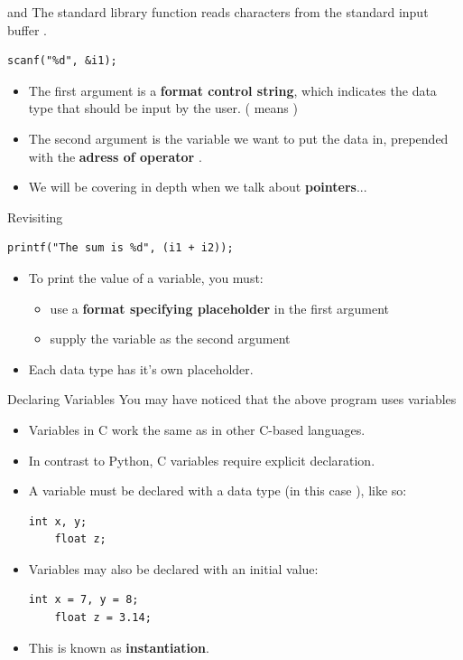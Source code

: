 \documentclass[11pt]{beamer}
\let\OldTexttt\texttt
\renewcommand{\texttt}[1]{\OldTexttt{\color{teal}{#1}}}
\begin{document}
\begin{frame}[fragile=singleslide]{\texttt{scanf} and \texttt{stdin}}
The standard library function \texttt{scanf} reads characters from the standard input buffer \texttt{stdin}.  
\begin{lstlisting}[style=C]
scanf("%d", &i1);
\end{lstlisting}
\begin{itemize}
\item The first argument is a \textbf{format control string}, which indicates the data type that should be input by the user. (\texttt{\%d} means \texttt{int})
\item The second argument is the variable we want \texttt{scanf} to put the data in, prepended with the \textbf{adress of operator} \texttt{\&}.
\item We will be covering \texttt{\&} in depth when we talk about \textbf{pointers}...
\end{itemize}
\end{frame}

\begin{frame}[fragile=singleslide]{Revisiting \texttt{printf}}
\begin{lstlisting}[style=C]
printf("The sum is %d", (i1 + i2));
\end{lstlisting}
\begin{itemize}
\item To print the value of a variable, you must:
\begin{itemize}
\item use a \textbf{format specifying placeholder} in the first argument
\item supply the variable as the second argument
\end{itemize}
\item Each data type has it's own placeholder.
\end{itemize}
\end{frame}

\begin{frame}[fragile=singleslide]{Declaring Variables}
You may have noticed that the above program uses variables
\begin{itemize}
\item Variables in C work the same as in other C-based languages.
\item In contrast to Python, C variables require explicit declaration.
\item A variable must be declared with a data type (in this case \texttt{int}), like so:
\begin{lstlisting}[style=C]
	int x, y;
	float z;
\end{lstlisting}
\item Variables may also be declared with an initial value:
\begin{lstlisting}[style=C]
	int x = 7, y = 8;
	float z = 3.14;
\end{lstlisting}
\item This is known as \textbf{instantiation}.
\end{itemize}
\end{frame}
\end{document}
